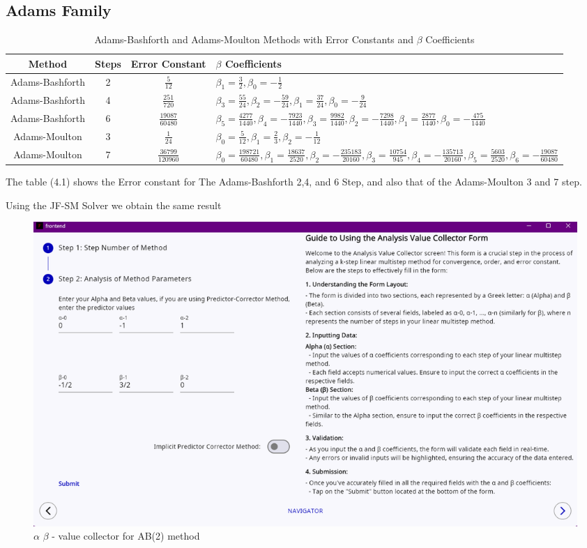 \documentclass[a4paper, twoside]{report} %
\begin{document}
	\subsection{Adams Family}
	\begin{table}[h!]
		\centering
		\begin{tabularx}{\textwidth}{|c|c|c|X|}
			\hline
			\textbf{Method} & \textbf{Steps} & \textbf{Error Constant} & \textbf{$\beta$ Coefficients} \\
			\hline
			Adams-Bashforth & 2 & $\frac{5}{12}$ & $\beta_1 = \frac{3}{2}, \beta_0 = -\frac{1}{2}$ \\
			\hline
			Adams-Bashforth & 4 & $\frac{251}{720}$ & $\beta_3 = \frac{55}{24}, \beta_2 = -\frac{59}{24}, \beta_1 = \frac{37}{24}, \beta_0 = -\frac{9}{24}$ \\
			\hline
			Adams-Bashforth & 6 & $\frac{19087}{60480}$ & $\beta_5 = \frac{4277}{1440}, \beta_4 = -\frac{7923}{1440}, \beta_3 = \frac{9982}{1440}, \beta_2 = -\frac{7298}{1440}, \beta_1 = \frac{2877}{1440}, \beta_0 = -\frac{475}{1440}$ \\
			\hline
			Adams-Moulton & 3 & $\frac{1}{24}$ & $\beta_0 = \frac{5}{12}, \beta_1 = \frac{2}{3}, \beta_2 = -\frac{1}{12}$ \\
			\hline
			Adams-Moulton & 7 & $\frac{36799}{120960}$ & $\beta_0 = \frac{198721}{60480}, \beta_1 = \frac{18637}{2520}, \beta_2 = -\frac{235183}{20160}, \beta_3 = \frac{10754}{945}, \beta_4 = -\frac{135713}{20160}, \beta_5 = \frac{5603}{2520}, \beta_6 = -\frac{19087}{60480}$ \\
			\hline
		\end{tabularx}
		\caption{Adams-Bashforth and Adams-Moulton Methods with Error Constants and $\beta$ Coefficients}
		\label{table:adams_methods}
	\end{table}
	The table (4.1) shows the Error constant for The Adams-Bashforth 2,4, and 6 Step, and also that of the Adams-Moulton 3 and 7 step.

	Using the JF-SM Solver we obtain the same result

	\begin{figure}[htbp]
		\centering
		\includegraphics[width=1\textwidth]{chapters/4/image/ab(2)a.png}
		\caption{$\alpha$ $\beta$ - value collector for AB(2) method}
	\end{figure}
\end{document}

